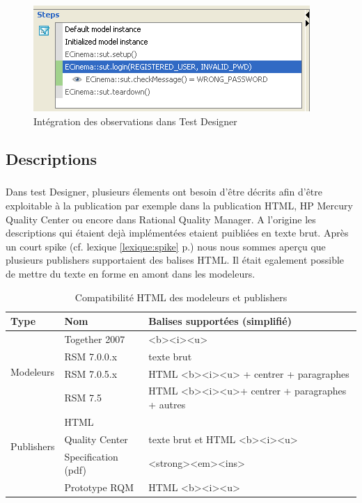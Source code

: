 \begin{figure}[!h]
\centering
\includegraphics[scale=0.5]{Illustrations/Observation.png}
\caption{Intégration des observations dans Test Designer}
\label{figure:obsTD}
\end{figure}

\subsection{Descriptions}

\subparagraph*{}
Dans test Designer, plusieurs élements ont besoin d'être décrits afin d'être exploitable à la publication par exemple dans la publication HTML, HP Mercury Quality Center ou encore dans Rational Quality Manager. A l'origine les descriptions qui étaient dejà implémentées etaient puibliées en texte brut. Après un court spike (cf. lexique \ref{lexique:spike} p.\pageref{figure:spike}) nous nous sommes aperçu que plusieurs publishers supportaient des balises HTML. Il était egalement possible de mettre du texte en forme en amont dans les modeleurs.

\begin{table}[h]
\caption{\label{tableau:compatDescHTML}Compatibilité HTML des modeleurs et publishers}
\begin{tabular}{|l|l|l|}
  \hline
  Type & Nom & Balises supportées (simplifié) \\
  \hline
  \multirow{4}{*}{Modeleurs} & Together 2007 & <b><i><u> \\
    & RSM 7.0.0.x & texte brut\\
    & RSM 7.0.5.x & HTML <b><i><u> + centrer + paragraphes\\ 
    & RSM 7.5 &  HTML <b><i><u>+ centrer + paragraphes + autres\\ \hline
  \multirow{3}{*}{Publishers} & HTML &  \\
    & Quality Center & texte brut et HTML <b><i><u> \\
    & Specification (pdf) & <strong><em><ins>  \\
    & Prototype RQM &  HTML <b><i><u> \\ \hline
 \hline
\end{tabular}
\end{table}



